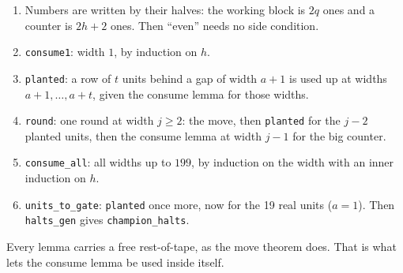 \documentclass[11pt]{article}
\theoremstyle{definition}
\theoremstyle{remark}
\begin{document}
\begin{enumerate}
\item Numbers are written by their halves: the working block is $2q$ ones and a
counter is $2h+2$ ones. Then ``even'' needs no side condition.
\item \texttt{consume1}: width $1$, by induction on $h$.
\item \texttt{planted}: a row of $t$ units behind a gap of width $a+1$ is used
up at widths $a+1,\dots,a+t$, given the consume lemma for those widths.
\item \texttt{round}: one round at width $j\ge 2$: the move, then
\texttt{planted} for the $j-2$ planted units, then the consume lemma at width
$j-1$ for the big counter.
\item \texttt{consume\_all}: all widths up to $199$, by induction on the width
with an inner induction on $h$.
\item \texttt{units\_to\_gate}: \texttt{planted} once more, now for the 19 real
units ($a=1$). Then \texttt{halts\_gen} gives \texttt{champion\_halts}.
\end{enumerate}
Every lemma carries a free rest-of-tape, as the move theorem does. That is what
lets the consume lemma be used inside itself.
\end{document}
